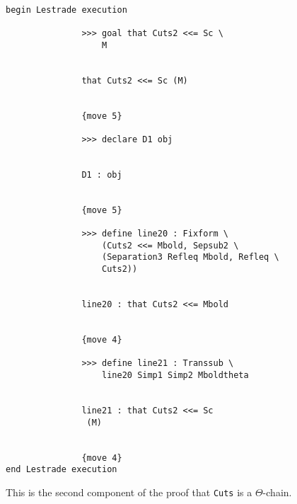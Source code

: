 \documentclass[12pt]{article}
\begin{document}
\begin{verbatim}

begin Lestrade execution

               >>> goal that Cuts2 <<= Sc \
                   M


               that Cuts2 <<= Sc (M)


               {move 5}

               >>> declare D1 obj


               D1 : obj


               {move 5}

               >>> define line20 : Fixform \
                   (Cuts2 <<= Mbold, Sepsub2 \
                   (Separation3 Refleq Mbold, Refleq \
                   Cuts2))


               line20 : that Cuts2 <<= Mbold


               {move 4}

               >>> define line21 : Transsub \
                   line20 Simp1 Simp2 Mboldtheta


               line21 : that Cuts2 <<= Sc 
                (M)


               {move 4}
end Lestrade execution
\end{verbatim}

This is the second component of the proof that {\tt Cuts} is a $\Theta$-chain.
\end{document}
